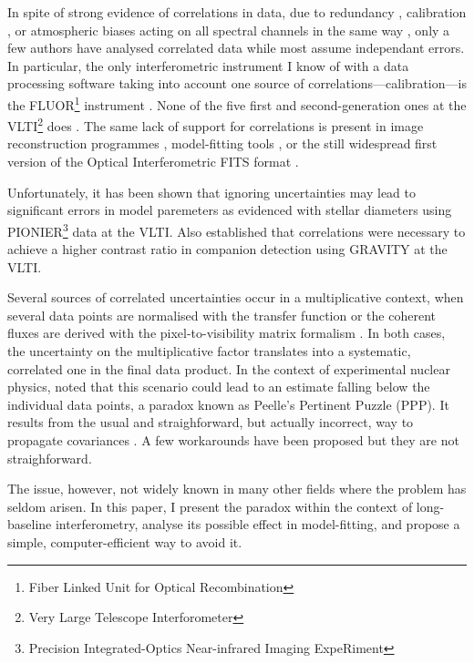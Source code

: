 \documentclass[a4paper,fleqn,usenatbib]{mnras}
\begin{document}
In spite of strong evidence of correlations in data, due to redundancy \citep[][in the case of closure phases]{MON07}, calibration \citep{PER03}, or atmospheric biases acting on all spectral channels in the same way \citep{LAW00}, only a few authors \citep{PER04,ABS06,BER06,LAC19,KAM20} have analysed correlated data while most assume independant errors.  In particular, the only interferometric instrument I know of with a data processing software taking into account one source of correlations---calibration---is the FLUOR\footnote{Fiber Linked Unit for Optical Recombination} instrument \citep[at IOTA\footnote{Infrared and Optical Telescope Array}, then CHARA\footnote{Center for High Angular Resolution Array}][]{PER04}. None of the five first and second-generation ones at the VLTI\footnote{Very Large Telescope Interforometer} does \citep{AMBER,MIDI,PIONIER,GRAVITYpipe,MATISSEpipe}.  The same lack of support for correlations is present in image reconstruction programmes \citep[e.g. MIRA, see][]{THI08}, model-fitting tools \citep[e.g. Litpro, see][]{TAL08}, or the still widespread first version of the Optical Interferometric FITS format \citep[OIFITS v. 1,][]{OIFITS1}.

Unfortunately, it has been shown that ignoring uncertainties may lead to significant errors in model paremeters as \citet{LAC19} evidenced with stellar diameters using PIONIER\footnote{Precision Integrated-Optics Near-infrared Imaging ExpeRiment} \citep{PIONIER} data at the VLTI. Also \citet{KAM20} established that correlations were necessary to achieve a higher contrast ratio in companion detection using GRAVITY \citep{GRAVITY} at the VLTI. 

Several sources of correlated uncertainties occur in a multiplicative context, when several data points are normalised with the transfer function \citep{PER03} or the coherent fluxes are derived with the pixel-to-visibility matrix formalism \citep{TAT07}.  In both cases, the uncertainty on the multiplicative factor translates into a systematic, correlated one in the final data product. In the context of experimental nuclear physics, \citet{PEE87} noted that this scenario could lead to an estimate falling below the individual data points, a paradox known as Peelle's Pertinent Puzzle (PPP). It results from the usual and straighforward, but actually incorrect, way to propagate covariances \citep{DAG94,NEU12}.  A few workarounds have been proposed \citep[e.g.][]{BUR11,BEC12,NIS14} but they are not straighforward.

The issue, however, not widely known in many other fields where the problem has seldom arisen.  In this paper, I present the paradox within the context of long-baseline interferometry, analyse its possible effect in model-fitting, and propose a simple, computer-efficient way to avoid it.
\end{document}
